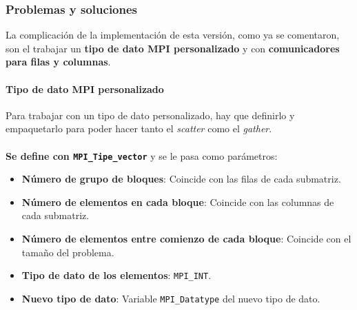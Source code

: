 \subsubsection{Problemas y soluciones}

La complicación de la implementación de esta versión, como ya se comentaron, son el trabajar un \textbf{tipo de dato MPI personalizado} y con \textbf{comunicadores para filas y columnas}.

\paragraph{Tipo de dato MPI personalizado}

Para trabajar con un tipo de dato personalizado, hay que definirlo y empaquetarlo para poder hacer tanto el \textit{scatter} como el \textit{gather}.
\\ \\
\textbf{Se define con \texttt{MPI\_Tipe\_vector}} y se le pasa como parámetros:
\begin{itemize}
	\item \textbf{Número de grupo de bloques}: Coincide con las filas de cada submatriz.
	\item \textbf{Número de elementos en cada bloque}: Coincide con las columnas de cada submatriz.
	\item \textbf{Número de elementos entre comienzo de cada bloque}: Coincide con el tamaño del problema.
	\item \textbf{Tipo de dato de los elementos}: \texttt{MPI\_INT}.
	\item \textbf{Nuevo tipo de dato}: Variable \texttt{MPI\_Datatype} del nuevo tipo de dato.
\end{itemize}


